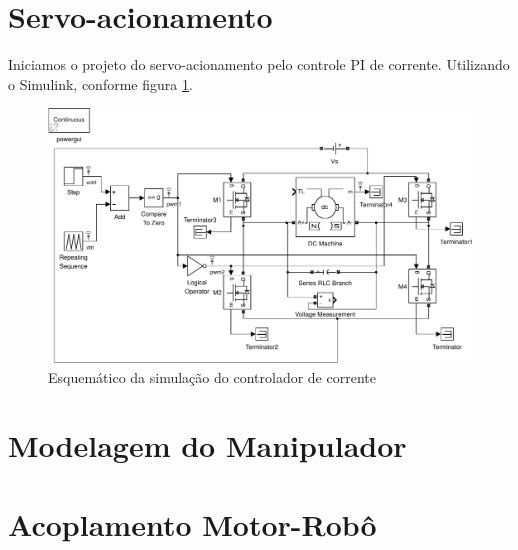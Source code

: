 \documentclass{article}
\begin{document}
\section{Servo-acionamento}
Iniciamos o projeto do servo-acionamento pelo controle PI de corrente. Utilizando o Simulink, conforme figura \ref{fig:sim2}.

\begin{figure}[H]
	\centering
	\includegraphics[width=\linewidth]{matlab/sim1}
	\caption{Esquemático da simulação do controlador de corrente}
	\label{fig:sim2}
\end{figure}

\section{Modelagem do Manipulador}
\section{Acoplamento Motor-Robô}



\end{document}

